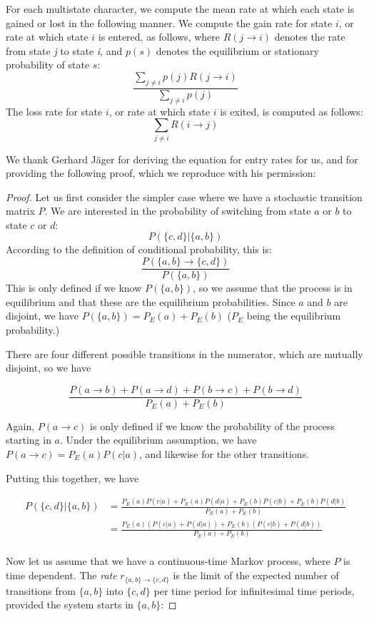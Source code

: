 \documentclass[12pt]{article}
\begin{document}
\begin{appendices}
For each multistate character, we compute the mean rate at which each state is gained or lost in the following manner. We compute the gain rate for state $i$, or rate at which state $i$ is entered, as follows, where $R(j \rightarrow i)$ denotes the rate from state \emph{j} to state \emph{i}, and $p(s)$ denotes the equilibrium or stationary probability of state $s$:
$$
\frac{\sum_{j \neq i} p(j) R(j \rightarrow i)}{\sum_{j \neq i} p(j)}
$$
The loss rate for state $i$, or rate at which state $i$ is exited, is computed as follows:
$$
\sum_{j \neq i} R(i \rightarrow j)
$$

We thank Gerhard J\"ager for deriving the equation for entry rates for us, and for providing the following proof, which we reproduce with his permission:

\begin{proof}
Let us first consider the simpler case where we have a stochastic transition matrix $P$. We are interested in the probability of switching from state $a$ or $b$ to state $c$ or $d$:
$$
P(\{c,d\}|\{a,b\})
$$
According to the definition of conditional probability, this is:
$$
\frac{P(\{a,b\} \rightarrow \{c,d\})}{P(\{a,b\})}
$$
This is only defined if we know $P(\{a,b\})$, so we assume that the process is in equilibrium and that these are the equilibrium probabilities. Since $a$ and $b$ are disjoint, we have $P(\{a,b\}) = P_E(a) + P_E(b)$ ($P_E$ being the equilibrium probability.)

There are four different possible transitions in the numerator, which are mutually disjoint, so we have 

$$
\frac{P(a \rightarrow b) + P(a \rightarrow d) + P(b \rightarrow c) + P(b \rightarrow d)}{P_E(a)+P_E(b)}
$$

Again, $P(a \rightarrow c)$ is only defined if we know the probability of the process starting in $a$. Under the equilibrium assumption, we have $P(a \rightarrow c) = P_E(a)P(c|a)$, and likewise for the other transitions.

Putting this together, we have

\begin{align*}
P(\{c,d\}|\{a,b\}) & = \frac{P_E(a)P(c|a) + P_E(a)P(d|a) + P_E(b)P(c|b) + P_E(b)P(d|b)}{P_E(a) + P_E(b)}\\
 & = \frac{P_E(a)(P(c|a) + P(d|a)) + P_E(b)(P(c|b) + P(d|b))}{P_E(a) + P_E(b)}\\
\end{align*}

Now let us assume that we have a continuous-time Markov process, where $P$ is time dependent. 
The {\em rate} $r_{\{a,b\} \rightarrow \{c,d\}}$ is the limit of the expected number of transitions from 
$\{a,b\}$ 
into 
$\{c,d\}$ 
per 
time period for infinitesimal time periods, provided the system starts in $\{a,b\}$:


\end{proof}
\end{appendices}
\end{document}
